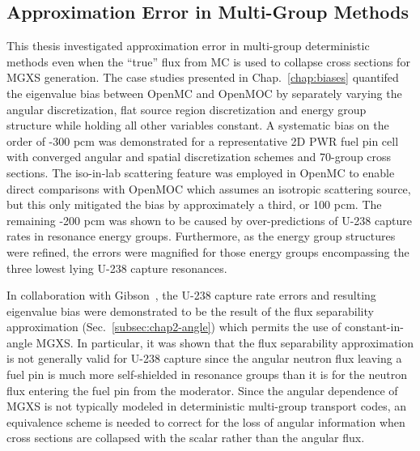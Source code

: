\subsection{Approximation Error in Multi-Group Methods}
\label{subsec:chap12-approx-error}

This thesis investigated approximation error in multi-group deterministic methods even when the ``true'' flux from \ac{MC} is used to collapse cross sections for \ac{MGXS} generation. The case studies presented in Chap.~\ref{chap:biases} quantifed the eigenvalue bias between OpenMC and OpenMOC by separately varying the angular discretization, flat source region discretization and energy group structure while holding all other variables constant. A systematic bias on the order of -300 \ac{pcm} was demonstrated for a representative 2D \ac{PWR} fuel pin cell with converged angular and spatial discretization schemes and 70-group cross sections. The iso-in-lab scattering feature was employed in OpenMC to enable direct comparisons with OpenMOC which assumes an isotropic scattering source, but this only mitigated the bias by approximately a third, or 100 \ac{pcm}. The remaining -200 \ac{pcm} was shown to be caused by over-predictions of U-238 capture rates in resonance energy groups. Furthermore, as the energy group structures were refined, the errors were magnified for those energy groups encompassing the three lowest lying U-238 capture resonances.


In collaboration with Gibson~\cite{gibson2016thesis}, the U-238 capture rate errors and resulting eigenvalue bias were demonstrated to be the result of the flux separability approximation (Sec.~\ref{subsec:chap2-angle}) which permits the use of constant-in-angle \ac{MGXS}. In particular, it was shown that the flux separability approximation is not generally valid for U-238 capture since the angular neutron flux leaving a fuel pin is much more self-shielded in resonance groups than it is for the neutron flux entering the fuel pin from the moderator. Since the angular dependence of \ac{MGXS} is not typically modeled in deterministic multi-group transport codes, an equivalence scheme is needed to correct for the loss of angular information when cross sections are collapsed with the scalar rather than the angular flux. 

